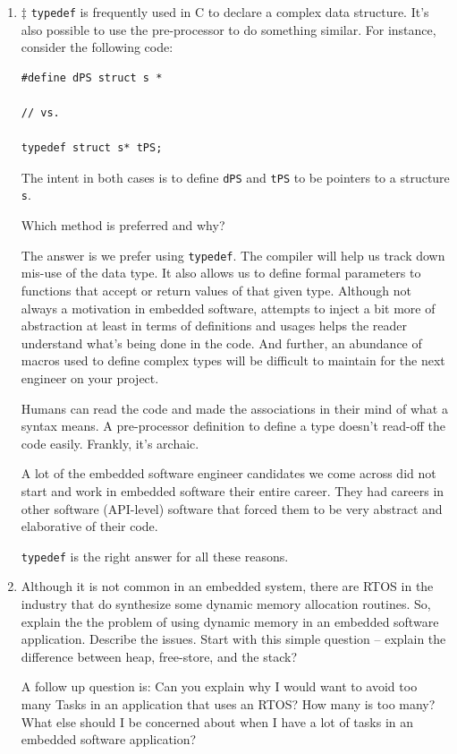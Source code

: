\documentclass[12pt]{article}
\begin{document}
\begin{enumerate}
\item $\ddagger$ {\texttt{typedef}} is frequently used in C to declare a complex
data structure.   It's also possible to use the pre-processor to do
something similar.  For instance, consider the following code:

\begin{lstlisting}
#define dPS struct s *

// vs.

typedef struct s* tPS;
\end{lstlisting}

The intent in both cases is to define {\texttt{dPS}} and
{\texttt{tPS}} to be pointers to a structure {\texttt{s}}.

Which method is preferred and why?

The answer is we prefer using {\texttt{typedef}}.  The compiler
will help us track down mis-use of the data type.  It also
allows us to define formal parameters to functions that
accept or return values of that given type.  Although not always
a motivation in embedded software, attempts to inject a bit more of 
abstraction at least in terms of definitions and usages helps the
reader understand what's being done in the code.  And further,
an abundance of macros used to define complex types will be difficult
to maintain for the next engineer on your project.  

Humans can read the code and made the associations in their mind
of what a syntax means.  A pre-processor definition to define a type
doesn't read-off the code easily.  Frankly, it's archaic.

A lot of the embedded software engineer candidates we come across
did not start and work in embedded software their entire career.
They had careers in other software (API-level) software that forced
them to be very abstract and elaborative of their code.

{\texttt{typedef}} is the right answer for all these reasons.

\item Although it is not common in an embedded system, there are RTOS
in the industry that do synthesize some dynamic memory allocation
routines.  So, explain the the problem of using dynamic memory
in an embedded software application.  Describe the issues. Start 
with this simple question -- explain the difference between heap, 
free-store, and the stack?

A follow up question is:   Can you explain why I would want to avoid
too many Tasks in an application that uses an RTOS?  How many is too many?
What else should I be concerned about when I have a lot of tasks in an
embedded software application?


\end{enumerate}
\end{document}
